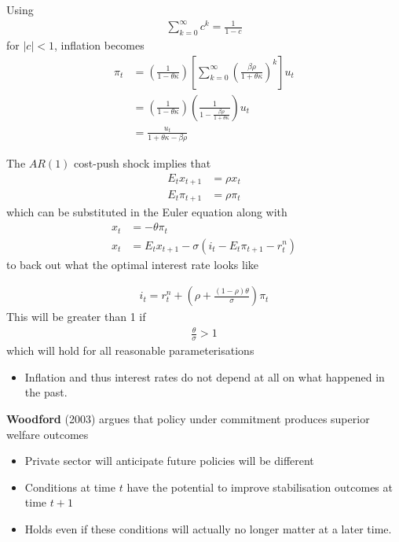 \documentclass{beamer}
\begin{document}
\begin{frame}
  Using
  \begin{align}
    \sum_{k=0}^{\infty}c^k=\frac{1}{1-c}
  \end{align}
for $|c|<1$, inflation becomes
\begin{align}
  \pi_t &= \left( \frac{1}{1-\theta\kappa} \right) \left[ \sum_{k=0}^{\infty} \left( \frac{\beta\rho}{1+\theta\kappa} \right)^k \right]u_t\\
  &= \left( \frac{1}{1-\theta\kappa} \right) \left( \frac{1}{1-\frac{\beta\rho}{1+\theta\kappa}} \right) u_t\\
  &= \frac{u_t}{1+\theta\kappa-\beta\rho}
\end{align}
\end{frame}
\begin{frame}
  The $AR(1)$ cost-push shock implies that 
\begin{align}
  E_tx_{t+1} &= \rho x_t\\
  E_t \pi_{t+1} &= \rho \pi_t  
\end{align}
which can be substituted in the Euler equation along with 
\begin{align}
  x_t&=-\theta\pi_t\\ \nonumber
  x_t&=E_t x_{t+1}-\sigma(i_t-E_t \pi_{t+1}-r_t^n)
\end{align}
to back out what the optimal interest rate looks like  
\end{frame}

\begin{frame}
  \begin{align}
  i_t=r_t^n+ \left( \rho + \frac{(1-\rho)\theta}{\sigma} \right) \pi_t
\end{align}
This will be greater than 1 if 
\begin{align}
 \frac{\theta}{\sigma}>1 
\end{align}
which will hold for all reasonable parameterisations
\begin{itemize}
   \item Inflation and thus interest rates do not depend at all on what happened in the past.
 \end{itemize} 
\end{frame}

\begin{frame}
  \textbf{Woodford} (2003) argues that policy under commitment produces superior welfare outcomes
  \begin{itemize}
    \item Private sector will anticipate future policies will be different
    \item Conditions at time $t$ have the potential to improve stabilisation outcomes at time $t+1$
    \item Holds even if these conditions will actually no longer matter at a later time. 
  \end{itemize}
\end{frame}
\end{document}

